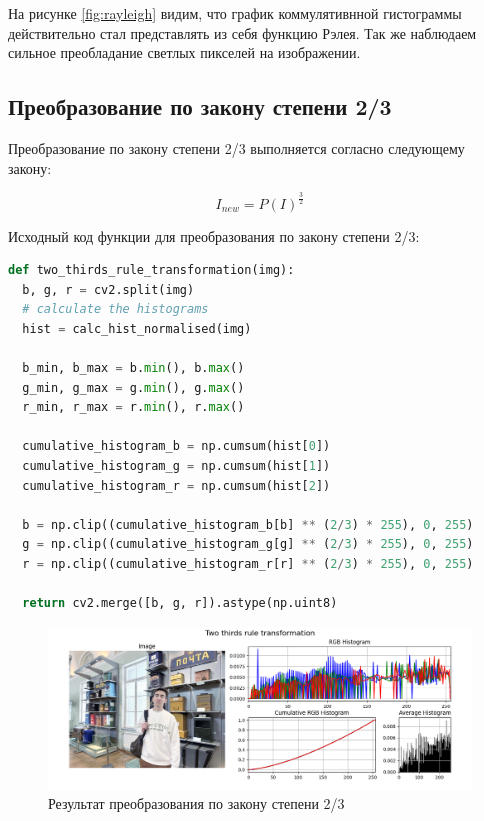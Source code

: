 \documentclass[a4paper, 12pt]{extarticle}
\begin{document}
На рисунке \ref{fig:rayleigh} видим, что график коммулятивнной гистограммы действительно стал представлять из себя функцию Рэлея. Так же наблюдаем сильное преобладание светлых пикселей на изображении. 

\subsection{Преобразование по закону степени 2/3}

Преобразование по закону степени 2/3 выполняется согласно следующему закону:

\begin{equation}
  I_{new} = P(I)^{\frac{3}{2}}
\end{equation}

Исходный код функции для преобразования по закону степени 2/3:

\begin{lstlisting}[language=Python]
def two_thirds_rule_transformation(img):
  b, g, r = cv2.split(img)
  # calculate the histograms
  hist = calc_hist_normalised(img)

  b_min, b_max = b.min(), b.max()
  g_min, g_max = g.min(), g.max()
  r_min, r_max = r.min(), r.max()

  cumulative_histogram_b = np.cumsum(hist[0]) 
  cumulative_histogram_g = np.cumsum(hist[1])
  cumulative_histogram_r = np.cumsum(hist[2])

  b = np.clip((cumulative_histogram_b[b] ** (2/3) * 255), 0, 255)
  g = np.clip((cumulative_histogram_g[g] ** (2/3) * 255), 0, 255)
  r = np.clip((cumulative_histogram_r[r] ** (2/3) * 255), 0, 255)
  
  return cv2.merge([b, g, r]).astype(np.uint8)
\end{lstlisting}

\begin{figure}[h]
    \centering
    \includegraphics[width=\textwidth]{../results/Two thirds rule transformation.png}
    \caption{Результат преобразования по закону степени 2/3}
    \label{fig:two_thirds}
\end{figure}
\end{document}

